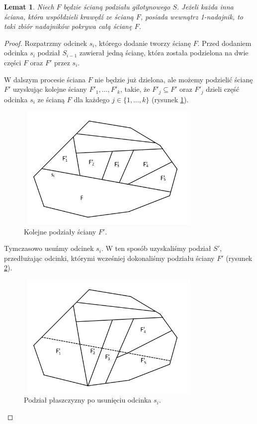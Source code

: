 \documentclass{xmgr}
\newtheorem{Lemat}{Lemat}
\theoremstyle{definition}
\begin{document}
\begin{Lemat}\label{sasiednie sciany strzega F} \cite{knadajniki}
  Niech $F$ będzie ścianą podziału gilotynowego $S$. Jeżeli każda inna ściana, która współdzieli krawędź ze ścianą $F$, posiada wewnątrz 1-nadajnik, to taki zbiór nadajników pokrywa całą ścianę $F$.
\end{Lemat}
\begin{proof}
\indent Rozpatrzmy odcinek $s_i$, którego dodanie tworzy ścianę $F$. Przed dodaniem odcinka $s_i$ podział $S_{i-1}$ zawierał jedną ścianę, która została podzielona na dwie części $F$ oraz $F'$ przez $s_i$. 

W dalszym procesie ściana $F$ nie będzie już dzielona, ale możemy podzielić ścianę $F'$ uzyskując kolejne ściany $F'_1, \ldots, F'_k$, takie, że $F'_j \subseteq F'$ oraz $F'_j$ dzieli część odcinka $s_i$ ze ścianą $F$ dla każdego $j \in \{1,\ldots,k\}$ (rysunek \ref{fig:podzial F' na kolejne ściany}).

\begin{figure}[ht!]
  \centering
  \includegraphics[width=9cm,height=6cm]{rysunki/podzial_F'.png}
  \caption{Kolejne podziały ściany $F'$.}
  \label{fig:podzial F' na kolejne ściany}
\end{figure} 
Tymczasowo usuńmy odcinek $s_i$. W ten sposób uzyskaliśmy podział $S'$, przedłużając odcinki, którymi wcześniej dokonaliśmy podziału ściany $F'$ (rysunek \ref{fig:podzial po usunieciu si}).

\begin{figure}[ht!]
  \centering
  \includegraphics[width=9cm,height=6cm]{rysunki/usuniete_si.png}
  \caption{Podział płaszczyzny po usunięciu odcinka $s_i$.}
  \label{fig:podzial po usunieciu si}
\end{figure} 


\end{proof}
\end{document}
